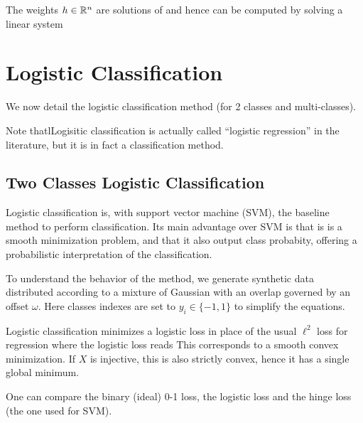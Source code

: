 The weights $h \in \mathbb{R}^n $ are solutions of
and hence can be computed by solving a linear system







\section{Logistic Classification}

We now detail the logistic classification method (for 2 classes and
multi-classes).

Note thatlLogisitic classification is actually called ``logistic
regression'' in the literature, but it is in fact a classification method.



\subsection{Two Classes Logistic Classification}

Logistic classification is, with support vector machine (SVM), the baseline
method to perform classification. Its main advantage over SVM is that is
is a smooth minimization problem, and that it also output class
probabity, offering a probabilistic interpretation of the classification.

To understand the behavior of the method, we generate synthetic data
distributed according to a mixture of Gaussian with an overlap governed by an offset $\omega$.
 Here classes indexes are set to $y_i \in
\{-1,1\}$ to simplify the equations.


Logistic classification minimizes a logistic loss in place of the usual
$\ell^2$ loss for regression
where the logistic loss reads
This corresponds to a smooth convex minimization. If $X$ is injective,
this is also strictly convex, hence it has a single global minimum.

One can compare the binary (ideal) 0-1 loss, the logistic loss and the hinge loss (the one used for SVM).


